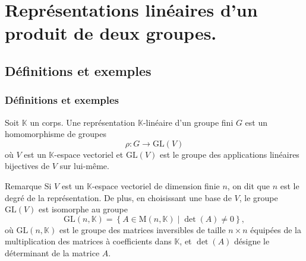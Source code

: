 \documentclass[9pt]{beamer}
\begin{document}
	
	\section{Représentations linéaires d'un produit de deux groupes.}
	\subsection{Définitions et exemples}
	
	\begin{frame}
		\frametitle{Définitions et exemples}
		
		\begin{definition} 
Soit \(\mathbb{K}\) un corps. Une représentation \(\mathbb{K}\)-linéaire d'un groupe fini \(G\) est un homomorphisme de groupes
			\[
			\rho : G \rightarrow \mathrm{GL}(V)
			\]
où \(V\) est un \(\mathbb{K}\)-espace vectoriel et \(\mathrm{GL}(V)\) est le groupe des applications linéaires bijectives de \(V\) sur lui-même.
		\end{definition}

		
		\begin{block}{Remarque} 
Si \(V\) est un \(\mathbb{K}\)-espace vectoriel de dimension finie \(n\), on dit que \(n\) est le degré de la représentation. De plus, en choisissant une base de \(V\), le groupe \(\mathrm{GL}(V)\) est isomorphe au groupe
			\[
			\mathrm{GL}(n, \mathbb{K}) = \left\{ A \in \mathrm{M}(n, \mathbb{K}) \mid \det(A) \neq 0 \right\},
			\]
où \(\mathrm{GL}(n, \mathbb{K})\) est le groupe des matrices inversibles de taille \(n \times n\) équipées de la multiplication des matrices à coefficients dans \(\mathbb{K}\), et \(\det(A)\) désigne le déterminant de la matrice \(A\).
		\end{block}
	\end{frame}
	
	
\end{document}
